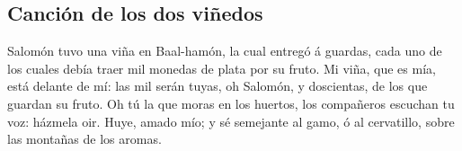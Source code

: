 \hypertarget{canciuxf3n-de-los-dos-viuxf1edos}{%
\subsection{Canción de los dos
viñedos}\label{canciuxf3n-de-los-dos-viuxf1edos}}

 Salomón tuvo una viña en Baal-hamón, la cual entregó á
guardas, cada uno de los cuales debía traer mil monedas de plata por su
fruto.  Mi viña, que es mía, está delante de mí: las mil
serán tuyas, oh Salomón, y doscientas, de los que guardan su fruto.
 Oh tú la que moras en los huertos, los compañeros escuchan
tu voz: házmela oir.  Huye, amado mío; y sé semejante al
gamo, ó al cervatillo, sobre las montañas de los aromas.
